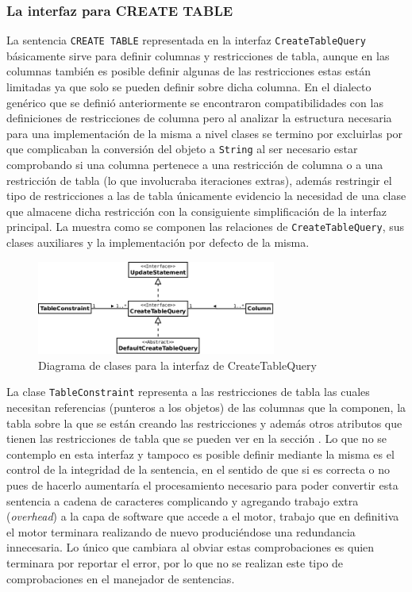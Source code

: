 \subsubsection{La interfaz para CREATE TABLE}
La sentencia \verb=CREATE TABLE= representada en la interfaz \verb=CreateTableQuery= básicamente sirve para definir columnas y restricciones de tabla, aunque en las columnas también es posible definir algunas de las restricciones estas están limitadas ya que solo se pueden definir sobre dicha columna. En el dialecto genérico que se definió anteriormente se encontraron compatibilidades con las definiciones de restricciones de columna pero al analizar la estructura necesaria para una implementación de la misma a nivel clases se termino por excluirlas por que complicaban la conversión del objeto a \verb=String= al ser necesario estar comprobando si una columna pertenece a una restricción de columna o a una restricción de tabla (lo que involucraba iteraciones extras), además restringir el tipo de restricciones a las de tabla únicamente evidencio la  necesidad de una clase que almacene dicha restricción con la consiguiente simplificación de la interfaz principal. La  muestra como se componen las relaciones de \verb=CreateTableQuery=, sus clases auxiliares y la implementación por defecto de la misma.
%
\begin{figure}[h]
  \centering
    \includegraphics[width=0.7\textwidth]{figuras/jdbgm-dc-createtable.png}
  \caption{Diagrama de clases para la interfaz de CreateTableQuery}
  \label{fig:dc-createtable}
\end{figure}

La clase \verb=TableConstraint= representa a las restricciones de tabla las cuales necesitan referencias (punteros a los objetos) de las columnas que la componen, la tabla sobre la que se están creando las restricciones y además otros atributos que tienen las restricciones de tabla que se pueden ver en la sección  . Lo que no se contemplo en esta interfaz y tampoco es posible definir mediante la misma es el control de la integridad de la sentencia, en el sentido de que si es correcta o no pues de hacerlo aumentaría el procesamiento necesario para poder convertir esta sentencia a cadena de caracteres complicando y agregando trabajo extra (\textit{overhead}) a la capa de software que accede a el motor, trabajo que en definitiva el motor terminara realizando de nuevo produciéndose una redundancia innecesaria. Lo único que cambiara al obviar estas comprobaciones es quien terminara por reportar el error, por lo que no se realizan este tipo de comprobaciones en el manejador de sentencias.

